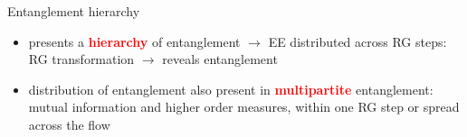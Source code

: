 \documentclass[11pt,aspectratio=169]{beamer}
\newcommand{\focus}[1]{\textcolor{red}{\bf{#1}}}
\begin{document}
\begin{frame}{Entanglement hierarchy}
\vspace*{\fill}

\begin{itemize}
	\item 
presents a \focus{hierarchy} of entanglement \(\longrightarrow\) EE distributed across RG steps:\\[10pt]
RG transformation \(\longrightarrow\) reveals entanglement

\vspace*{\fill}
\item distribution of entanglement also present in \focus{multipartite} entanglement:\\[10pt]
	mutual information and higher order measures, within one RG step or spread across the flow
\end{itemize}

\end{frame}
\end{document}
